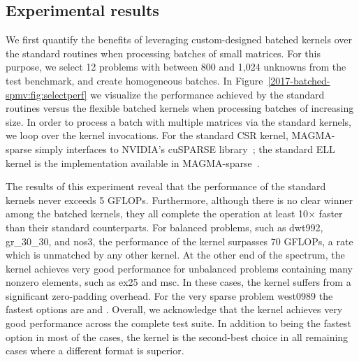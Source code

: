 \subsection{Experimental results}
We first quantify the benefits of leveraging custom-designed batched kernels 
over the standard \spmv routines when processing batches of small matrices. 
For this purpose, we select 12 problems with between 800 and 1,024 unknowns 
from the test benchmark, and create
homogeneous batches.
In Figure~\ref{2017-batched-spmv:fig:selectperf} we visualize the performance achieved by
the standard \spmv routines versus the flexible batched \spmv kernels when
processing batches of increasing size.
In order to process a batch with multiple matrices via the standard \spmv 
kernels, we loop over the kernel invocations.
For the standard CSR kernel, MAGMA-sparse simply interfaces to NVIDIA's 
cuSPARSE library~\cite{cuda8.0};
the standard ELL kernel is the implementation available in 
MAGMA-sparse~\cite{sellpreport}.

The results of this experiment reveal
that the performance of the standard \spmv kernels never exceeds 5 GFLOPs.
Furthermore, although there is no clear winner among the batched \spmv kernels, 
they
all complete the operation at least 10$\times$ faster than their standard 
counterparts. 
For balanced problems, such as {\sc dwt992}, {\sc gr\_30\_30}, and {\sc nos3},
the performance of the \ell kernel surpasses 70 GFLOPs, a rate which is 
unmatched by any other kernel.
At the other end of the spectrum, the \csri kernel achieves very good 
performance for unbalanced
problems containing many nonzero elements, such as {\sc ex25} and {\sc msc}.
In these cases, the \ell kernel suffers from a significant zero-padding 
overhead.
For the very sparse problem {\sc west0989} the fastest options are \csrscal and 
\coo.
Overall, we acknowledge that the \coo kernel achieves very good performance 
across the complete test suite. In addition to being the fastest option in most 
of the cases, the \coo kernel
is the second-best choice in all remaining cases where a different format is 
superior.

